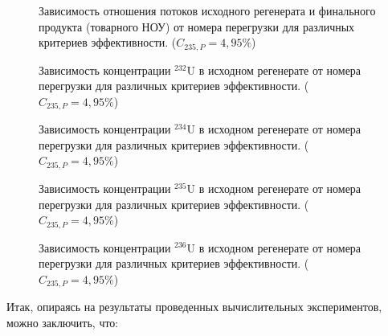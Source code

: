 \begin{figure}[h]
    \centering
    
    \caption{Зависимость отношения потоков исходного регенерата и финального продукта (товарного НОУ) от номера перегрузки для различных критериев эффективности. ($C_{235,{P}}=4,95\%$)}\label{7}
\end{figure}

%     

\begin{figure}[h]
    \centering
    \begin{minipage}{.5\textwidth}
      \centering
      
      \caption{{Зависимость концентрации $^{232}$U в исходном регенерате от номера перегрузки для различных критериев эффективности. ($C_{235,{P}}=4,95\%$){\label{8}}}}
    \end{minipage}%
    \begin{minipage}{.5\textwidth}
      \centering
      
\caption{{Зависимость концентрации $^{234}$U в исходном регенерате от номера перегрузки для различных критериев эффективности. ($C_{235,{P}}=4,95\%$){\label{9}}}}
\end{minipage}
\end{figure}

\begin{figure}[h]
    \centering
    \begin{minipage}{.5\textwidth}
      \centering
      
      \caption{{Зависимость концентрации $^{235}$U в исходном регенерате от номера перегрузки для различных критериев эффективности. ($C_{235,{P}}=4,95\%$){\label{10}}}}
    \end{minipage}%
    \begin{minipage}{.5\textwidth}
      \centering
      
\caption{{Зависимость концентрации $^{236}$U в исходном регенерате от номера перегрузки для различных критериев эффективности. ($C_{235,{P}}=4,95\%$){\label{11}}}}
\end{minipage}
\end{figure}

\newpage

Итак, опираясь на результаты проведенных вычислительных экспериментов, можно заключить, что:

